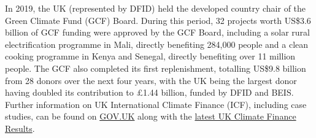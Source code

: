 In 2019, the UK (represented by DFID) held the developed country chair of the Green Climate Fund (GCF) Board. %
During this period, 32 projects worth US\$3.6 billion of GCF funding were approved by the GCF Board, including a solar rural electrification programme in Mali, directly benefiting 284,000 people and a clean cooking programme in Kenya and Senegal, directly benefiting over 11 million people. %
The GCF also completed its first replenishment, totalling US\$9.8 billion from 28 donors over the next four years, with the UK being the largest donor having doubled its contribution to \pounds 1.44 billion, funded by DFID and BEIS. \\%

Further information on UK International Climate Finance (ICF), including case studies, can be found on \href{https://www.gov.uk/guidance/international-climate-finance#our-portfolio-across-the-world}{GOV.UK} along with the \href{https://www.gov.uk/government/publications/uk-climate-finance-results}{latest UK Climate Finance Results}. %


\newpage
